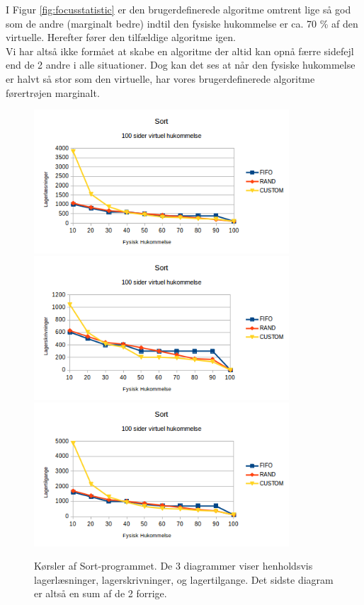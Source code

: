 I Figur \ref{fig:focusstatistic} er den brugerdefinerede algoritme omtrent lige så god som de andre (marginalt bedre) indtil den fysiske hukommelse er ca. 70 \% af den virtuelle. Herefter fører den tilfældige algoritme igen.\\

Vi har altså ikke formået at skabe en algoritme der altid kan opnå færre sidefejl end de 2 andre i alle situationer. Dog kan det ses at når den fysiske hukommelse er halvt så stor som den virtuelle, har vores brugerdefinerede algoritme førertrøjen marginalt.\\

\begin{figure}[H]
	\centering
	\includegraphics[width=0.85\textwidth]{figures/SortReads.png}	\includegraphics[width=0.85\textwidth]{figures/SortWrites.png}	\includegraphics[width=0.85\textwidth]{figures/SortAccess.png}
	\caption{Kørsler af Sort-programmet. De 3 diagrammer viser henholdsvis lagerlæsninger, lagerskrivninger, og lagertilgange. Det sidste diagram er altså en sum af de 2 forrige.}
	\label{fig:sortdisk}
\end{figure}


